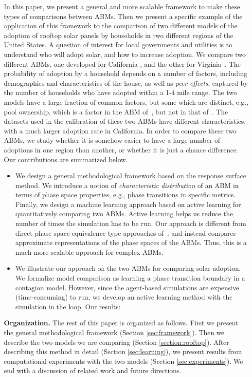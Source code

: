 In this paper, we present a general and more scalable framework to make these types of comparisons between ABMs.
Then we present a specific example of the application of this framework to the comparison of two different 
models of the adoption of rooftop solar panels by households in two different regions of the United States.
A question of interest for local governments and utilities is to
understand who will adopt solar, and how to increase adoption.
We compare two different ABMs, one developed for California \cite{zhang16solar},
and the other for Virginia~\cite{hu19rooftop}. The probability of adoption by a household depends on a number of factors,
including demographics and characteristics of the house, as well as \emph{peer effects}, captured by the number of
households who have adopted within a 1-4 mile range. The two models have a large fraction of common factors,
but some which are distinct, e.g., pool ownership, which is a factor in the ABM of~\cite{zhang16solar},
but not in that of~\cite{hu19rooftop}. The datasets used in the calibration of these two ABMs have different
characteristics, with a much larger adoption rate in California.
In order to compare these two ABMs, we study whether it is somehow easier to have a large number of adoptions 
in one region than another, or whether it is just a chance difference. 
Our contributions are summarized below.
\begin{itemize}
\item
We design a general methodological framework based on the response surface method. We introduce a notion of
\emph{characteristic distribution} of an ABM in terms of phase space properties, e.g., phase transitions
in specific metrics. 
Finally, we design a machine learning approach based on active learning for quantitatively comparing two ABMs.
Active learning helps us reduce the number of times the simulation has to be run.
Our approach is different from direct phase space equivalence type approaches of~\cite{axtell96aligning},
and instead compares approximate representations of the phase spaces of the ABMs. Thus, this is a much
more scalable approach for complex ABMs.
\item
We illustrate our approach on the two ABMs for comparing solar adoption.
We formalize model comparison as learning a phase transition boundary in a contagion model. However, since the agent-based simulations are expensive (time-consuming) to run, we develop an active learning method with the simulation in the loop. 
Our results:
\end{itemize}

\noindent
\textbf{Organization.}
The rest of this paper is organized as follows. First we present the general methodological framework
(Section \ref{sec:framework}).
Then we describe the two models we are comparing (Section \ref{section:rooftop}).
After describing this method in detail (Section \ref{sec:learning}), we present results from computational experiments with the two models (Section \ref{sec:experiments}). We end with a discussion of related work and future directions.
